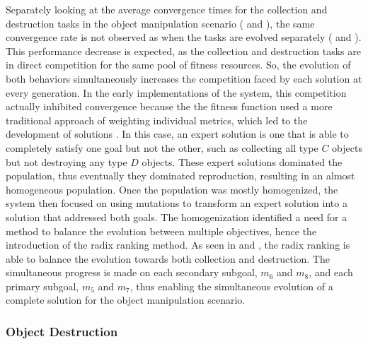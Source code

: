 Separately looking at the average convergence times for the collection and destruction tasks in the object manipulation scenario ( and ), the same convergence rate is not observed as when  the tasks are evolved separately ( and ).  This performance decrease is expected, as the collection and destruction tasks are in direct competition for the same pool of fitness resources.  So, the evolution of both behaviors simultaneously increases the competition faced by each solution at every generation.  In the early implementations of the system, this competition actually inhibited convergence because the the fitness function used a more traditional approach of weighting individual metrics, which led to the development of  solutions \cite{kovacina:AdaptiveIntelligentEvolution}.  In this case, an expert solution is one that is able to completely satisfy one goal but not the other, such as collecting all type $C$ objects but not destroying any type $D$ objects.  These expert solutions dominated the population, thus eventually they dominated reproduction, resulting in an almost homogeneous population.  Once the population was mostly homogenized, the system then focused on using mutations to transform an expert solution into a solution that addressed both goals.  The homogenization identified a need for a method to balance the evolution between multiple objectives, hence the introduction of the radix ranking method.  As seen in  and , the radix ranking is able to balance the evolution towards both collection and destruction.  The simultaneous progress is made on each secondary subgoal, $m_6$ and $m_8$, and each primary subgoal, $m_5$ and $m_7$, thus enabling the simultaneous evolution of a complete solution for the object manipulation scenario.

\subsubsection{Object Destruction}

